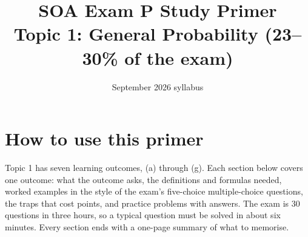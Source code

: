 \documentclass[11pt,letterpaper]{article}
\title{SOA Exam P Study Primer\\[4pt]\large Topic 1: General Probability (23--30\% of the exam)}
\author{}
\date{September 2026 syllabus}
\newcounter{example}[section]
\newcounter{practice}[section]
\begin{document}
\maketitle

\section*{How to use this primer}
Topic 1 has seven learning outcomes, (a) through (g). Each section below covers one outcome:
what the outcome asks, the definitions and formulas needed, worked examples in the style of the
exam's five-choice multiple-choice questions, the traps that cost points, and practice problems
with answers. The exam is 30 questions in three hours, so a typical question must be solved in
about six minutes. Every section ends with a one-page summary of what to memorise.
\tableofcontents
\clearpage


\clearpage

\clearpage

\clearpage

\clearpage

\clearpage

\clearpage

\end{document}
